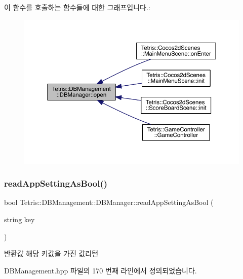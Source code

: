 이 함수를 호출하는 함수들에 대한 그래프입니다.\+:
\nopagebreak
\begin{figure}[H]
\begin{center}
\leavevmode
\includegraphics[width=350pt]{da/d79/class_tetris_1_1_d_b_management_1_1_d_b_manager_a8bf7e756a9cca7e57fef00076fb62f36_icgraph}
\end{center}
\end{figure}
\mbox{\label{class_tetris_1_1_d_b_management_1_1_d_b_manager_a598b8014fcad434b5b1162cc6767d22c}} 
\subsubsection{\texorpdfstring{read\+App\+Setting\+As\+Bool()}{readAppSettingAsBool()}}
{\footnotesize\ttfamily bool Tetris\+::\+D\+B\+Management\+::\+D\+B\+Manager\+::read\+App\+Setting\+As\+Bool (\begin{DoxyParamCaption}\item[{string}]{key }\end{DoxyParamCaption})\hspace{0.3cm}{\ttfamily [inline]}}

\begin{DoxyReturn}{반환값}
해당 키값을 가진 값리턴 
\end{DoxyReturn}


D\+B\+Management.\+hpp 파일의 170 번째 라인에서 정의되었습니다.


